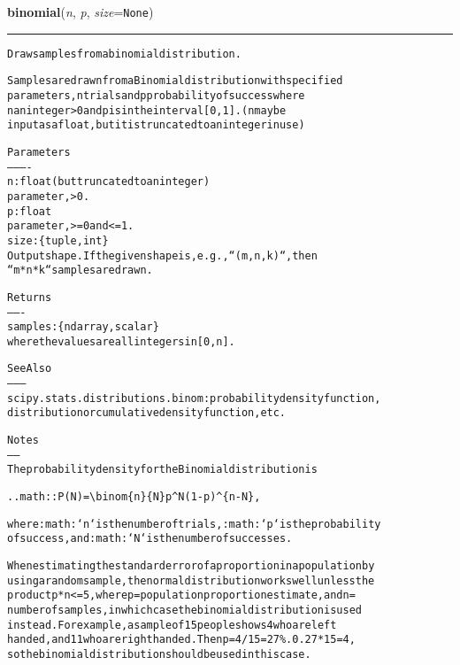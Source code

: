     \label{QSTK:qstklearn:mldiagnostics:binomial}

    \vspace{0.5ex}

\hspace{.8\funcindent}\begin{boxedminipage}{\funcwidth}

    \raggedright \textbf{binomial}(\textit{n}, \textit{p}, \textit{size}={\tt None})

    \vspace{-1.5ex}

    \rule{\textwidth}{0.5\fboxrule}
\setlength{\parskip}{2ex}
\begin{alltt}
Draw samples from a binomial distribution.

Samples are drawn from a Binomial distribution with specified
parameters, n trials and p probability of success where
n an integer {\textgreater} 0 and p is in the interval [0,1]. (n may be
input as a float, but it is truncated to an integer in use)

Parameters
----------
n : float (but truncated to an integer)
        parameter, {\textgreater} 0.
p : float
        parameter, {\textgreater}= 0 and {\textless}=1.
size : \{tuple, int\}
    Output shape.  If the given shape is, e.g., ``(m, n, k)``, then
    ``m * n * k`` samples are drawn.

Returns
-------
samples : \{ndarray, scalar\}
          where the values are all integers in  [0, n].

See Also
--------
scipy.stats.distributions.binom : probability density function,
    distribution or cumulative density function, etc.

Notes
-----
The probability density for the Binomial distribution is

.. math:: P(N) = {\textbackslash}binom\{n\}\{N\}p{\textasciicircum}N(1-p){\textasciicircum}\{n-N\},

where :math:`n` is the number of trials, :math:`p` is the probability
of success, and :math:`N` is the number of successes.

When estimating the standard error of a proportion in a population by
using a random sample, the normal distribution works well unless the
product p*n {\textless}=5, where p = population proportion estimate, and n =
number of samples, in which case the binomial distribution is used
instead. For example, a sample of 15 people shows 4 who are left
handed, and 11 who are right handed. Then p = 4/15 = 27\%. 0.27*15 = 4,
so the binomial distribution should be used in this case.


\end{alltt}
\end{boxedminipage}
